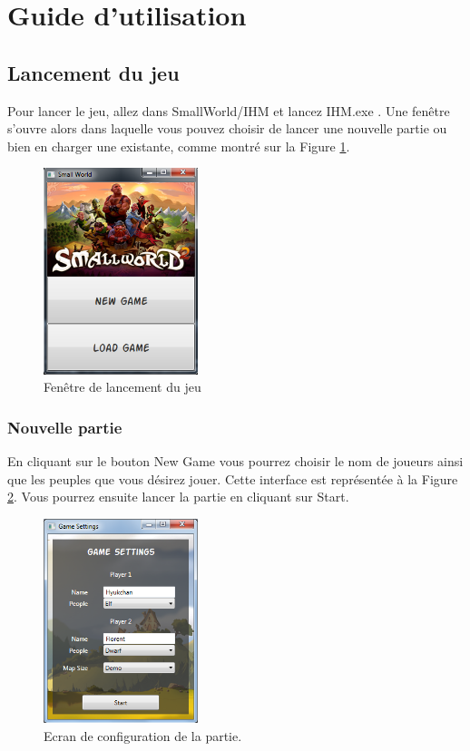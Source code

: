 \documentclass[a4paper]{article}
\begin{document}
\section{Guide d'utilisation}
	\subsection{Lancement du jeu}
	Pour lancer le jeu, allez dans SmallWorld/IHM et lancez \og IHM.exe \fg{}. Une fenêtre s'ouvre alors dans laquelle vous pouvez choisir de lancer une nouvelle partie ou bien en charger une existante, comme montré sur la Figure \ref{fig:lancement}.
	\begin{figure}[h!]
		\centering
		\includegraphics[width=0.4\textwidth]{../../IHM/lancement.png}
		\caption{Fenêtre de lancement du jeu}
		\label{fig:lancement}		
	\end{figure}

		\subsubsection{Nouvelle partie}
		En cliquant sur le bouton \og New Game\fg{} vous pourrez choisir le nom de joueurs ainsi que les peuples que vous désirez jouer. Cette interface est représentée à la Figure \ref{fig:settings}.
		Vous pourrez ensuite lancer la partie en cliquant sur \og Start\fg{}.
		\begin{figure}[h!]
			\centering
			\includegraphics[width=0.4\textwidth]{../../IHM/settings.png}
			\caption{Ecran de configuration de la partie.}
			\label{fig:settings}
		\end{figure}
\end{document}
